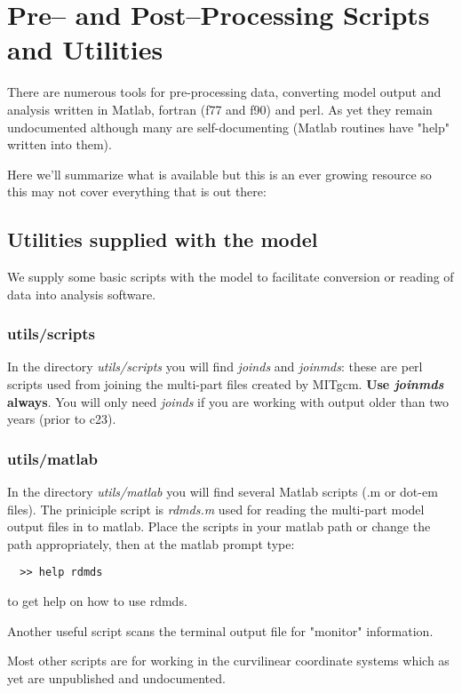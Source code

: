 \section{Pre-- and Post--Processing Scripts and Utilities}

There are numerous tools for pre-processing data, converting model
output and analysis written in Matlab, fortran (f77 and f90) and perl.
As yet they remain undocumented although many are self-documenting
(Matlab routines have "help" written into them).

Here we'll summarize what is available but this is an ever growing
resource so this may not cover everything that is out there:

\subsection{Utilities supplied with the model}

We supply some basic scripts with the model to facilitate conversion
or reading of data into analysis software.

\subsubsection{utils/scripts}

In the directory {\em utils/scripts} you will find {\em joinds} and
{\em joinmds}: these are perl scripts used from joining the multi-part
files created by MITgcm. {\bf Use {\em joinmds} always}. You will only
need {\em joinds} if you are working with output older than two years
(prior to c23).

\subsubsection{utils/matlab}

In the directory {\em utils/matlab} you will find several Matlab
scripts (.m or dot-em files). The priniciple script is {\em rdmds.m}
used for reading the multi-part model output files in to matlab. Place
the scripts in your matlab path or change the path appropriately, then
at the matlab prompt type:
\begin{verbatim}
  >> help rdmds
\end{verbatim}
to get help on how to use rdmds.

Another useful script scans the terminal output file for "monitor"
information.

Most other scripts are for working in the curvilinear coordinate
systems which as yet are unpublished and undocumented.


